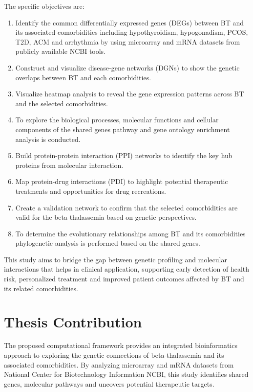 The specific objectives are:


\begin{enumerate}[label=\arabic*)]
\item Identify the common differentially expressed genes (DEGs) between BT and its associated comorbidities including hypothyroidism, hypogonadism, PCOS, T2D, ACM and arrhythmia by using microarray and mRNA datasets from publicly available NCBI tools.
\item Construct and visualize disease-gene networks (DGNs) to show the genetic overlaps between BT and each comorbidities.
\item Visualize heatmap analysis to reveal the gene expression patterns across BT and the selected comorbidities.
\item To explore the biological processes, molecular functions and cellular components of the shared genes pathway and gene ontology enrichment analysis is conducted.
\item Build protein-protein interaction (PPI) networks to identify the key hub proteins from molecular interaction.
\item Map protein-drug interactions (PDI) to highlight potential therapeutic treatments and opportunities for drug recreations.
\item Create a validation network to confirm that the selected comorbidities are valid for the beta-thalassemia based on genetic perspectives.
\item To determine the evolutionary relationships among BT and its comorbidities phylogenetic analysis is performed based on the shared genes.
\end{enumerate}


This study aims to bridge the gap between genetic profiling and molecular interactions that helps in clinical application, supporting early detection of health risk, personalized treatment and improved patient outcomes affected by BT and its related comorbidities.


\section{Thesis Contribution}
\label{sec:sec01}

The proposed computational framework provides an integrated bioinformatics approach to exploring the genetic connections of beta-thalassemia and its associated comorbidities. By analyzing microarray and mRNA datasets from National Center for Biotechnology Information NCBI, this study identifies shared genes, molecular pathways and uncovers potential therapeutic targets. 

